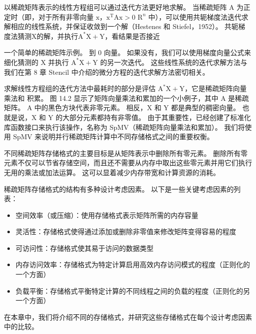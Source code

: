 以稀疏矩阵表示的线性方程组可以通过迭代方法更好地求解。 当稀疏矩阵 $\mathrm{A}$ 为正定时（即，对于所有非零向量 $\mathrm{x}$，$\mathrm{x}^{\mathrm{T}} \mathrm{Ax}>0$ $\mathrm{R}^{n}$ 中），可以使用共轭梯度法迭代求解相应的线性系统，并保证收敛到一个解（Hestenes 和 Stiefel，1952）。 共轭梯度法猜测$\mathrm{X}$的解，并执行$\mathrm{A}^{*} \mathrm{X}+\mathrm{Y}$，看结果是否接近

一个简单的稀疏矩阵示例。 到 0 向量。 如果没有，我们可以使用梯度向量公式来细化猜测的 $\mathrm{X}$ 并执行 $\mathrm{A}^{*} \mathrm{X}+\mathrm{Y}$ 的另一次迭代。 这些线性系统的迭代求解方法与我们在第 8 章 Stencil 中介绍的微分方程的迭代求解方法密切相关。

求解线性方程组的迭代方法中最耗时的部分是评估 $\mathrm{A}^{*} \mathrm{X}+\mathrm{Y}$，它是稀疏矩阵向量乘法和 积累。 图 14.2 显示了矩阵向量乘法和累加的一个小例子，其中 A 是稀疏矩阵。 $\mathrm{A}$ 中的黑色方块代表非零元素。 相反，$\mathrm{X}$ 和 $\mathrm{Y}$ 都是典型的稠密向量。 也就是说，$\mathrm{X}$ 和 $\mathrm{Y}$ 的大部分元素都持有非零值。 由于其重要性，已经创建了标准化库函数接口来执行该操作，名称为 SpMV（稀疏矩阵向量乘法和累加）。 我们将使用 SpMV 来说明并行稀疏矩阵计算中不同存储格式之间的重要权衡。

不同稀疏矩阵存储格式的主要目标是从矩阵表示中删除所有零元素。 删除所有零元素不仅可以节省存储空间，而且还不需要从内存中取出这些零元素并用它们执行无用的乘法或加法运算。 这可以显着减少内存带宽和计算资源的消耗。

稀疏矩阵存储格式的结构有多种设计考虑因素。 以下是一些关键考虑因素的列表：

\begin{itemize}
   \item 空间效率（或压缩）：使用存储格式表示矩阵所需的内存容量

   \item 灵活性：存储格式使得通过添加或删除非零值来修改矩阵变得容易的程度

   \item 可访问性：存储格式使其易于访问的数据类型

   \item 内存访问效率：存储格式为特定计算启用高效内存访问模式的程度（正则化的一个方面）

   \item 负载平衡：存储格式平衡特定计算的不同线程之间的负载的程度（正则化的另一个方面）

\end{itemize}

在本章中，我们将介绍不同的存储格式，并研究这些存储格式在每个设计考虑因素中的比较。

